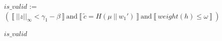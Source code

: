 \documentclass[runningheads]{llncs}
\numberwithin{equation}{section}
\begin{document}
\begin{algorithm}
\begin{algorithmic}[1]
            \vspace{1ex}
            
            \State $is\_valid$ := $\left(\ \big\llbracket\ {\big|\big| z \big|\big|}_{\infty} < {\gamma}_{1} - \beta\ \big\rrbracket\ \mathrm{and}\ \big\llbracket\ \tilde{c} = H(\mu\ ||\ {w}_{1}')\ \big\rrbracket\ \mathrm{and}\ \big\llbracket\ weight(h) \leq \omega\ \big\rrbracket\ \right)$
           
            \vspace{1ex}
            
            \State \Return $is\_valid$
        \end{algorithmic}
   
    \end{algorithm}
    \vspace{-3.75ex}
\end{document}
